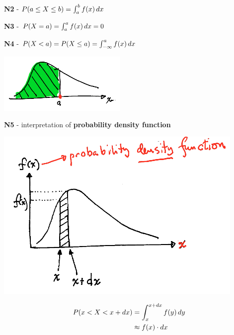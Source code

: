 \documentclass[10pt, landscape]{article}
\begin{document}
\begin{multicols*}{3}
\begin{minipage}[c]{0.6\linewidth}
    \textbf{N2} - $P(a \leq X \leq b) = \int^b_a f(x) \mathop{dx}$

    \textbf{N3} - $P(X=a) = \int^a_a f(x) \mathop{dx} = 0$

    \textbf{N4} - $P(X < a) = P(X \leq a) = \int^a_{-\infty} f(x) \mathop{dx}$
  \end{minipage}
  \begin{minipage}[c]{0.35\linewidth}
    \includegraphics[width=0.9\linewidth]{st2131-continuous-rv-fx.png} 
  \end{minipage}

  \textbf{N5} - interpretation of \textbf{probability density function} 

  \begin{minipage}[c]{0.4\linewidth}
    \includegraphics[width=0.9\linewidth]{st2131-pdf.png} 
  \end{minipage}
  \begin{minipage}[c]{0.55\linewidth}
    \begin{align*}
      P(x < X < x + \mathop{dx}) &= \int^{x+\mathop{dx}}_x f(y) \mathop{dy} 
                      \\ &\approx f(x) \cdot \mathop{dx}
    \end{align*}


\end{minipage}
\end{multicols*}
\end{document}
